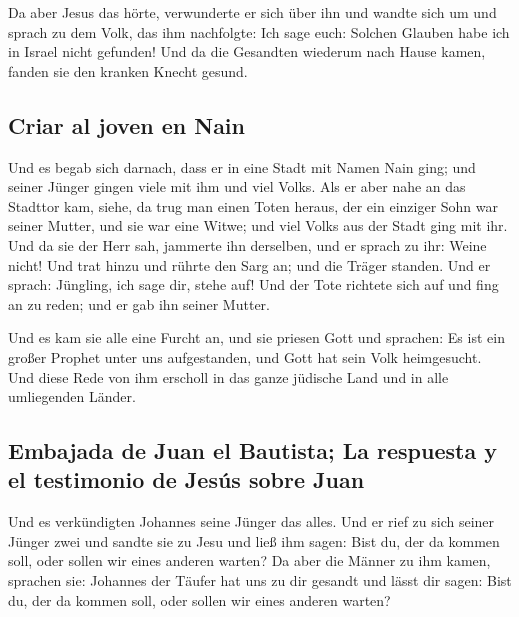  Da aber Jesus das hörte, verwunderte er sich über ihn und
wandte sich um und sprach zu dem Volk, das ihm nachfolgte: Ich sage
euch: Solchen Glauben habe ich in Israel nicht gefunden! 
Und da die Gesandten wiederum nach Hause kamen, fanden sie den kranken
Knecht gesund.

\hypertarget{criar-al-joven-en-nain}{%
\subsection{Criar al joven en Nain}\label{criar-al-joven-en-nain}}

 Und es begab sich darnach, dass er in eine Stadt mit
Namen Nain ging; und seiner Jünger gingen viele mit ihm und viel Volks.
 Als er aber nahe an das Stadttor kam, siehe, da trug man
einen Toten heraus, der ein einziger Sohn war seiner Mutter, und sie war
eine Witwe; und viel Volks aus der Stadt ging mit ihr. 
Und da sie der Herr sah, jammerte ihn derselben, und er sprach zu ihr:
Weine nicht!  Und trat hinzu und rührte den Sarg an; und
die Träger standen. Und er sprach: Jüngling, ich sage dir, stehe auf!
 Und der Tote richtete sich auf und fing an zu reden; und
er gab ihn seiner Mutter.

 Und es kam sie alle eine Furcht an, und sie priesen Gott
und sprachen: Es ist ein großer Prophet unter uns aufgestanden, und Gott
hat sein Volk heimgesucht.  Und diese Rede von ihm
erscholl in das ganze jüdische Land und in alle umliegenden Länder.

\hypertarget{embajada-de-juan-el-bautista-la-respuesta-y-el-testimonio-de-jesuxfas-sobre-juan}{%
\subsection{Embajada de Juan el Bautista; La respuesta y el testimonio
de Jesús sobre
Juan}\label{embajada-de-juan-el-bautista-la-respuesta-y-el-testimonio-de-jesuxfas-sobre-juan}}

 Und es verkündigten Johannes seine Jünger das alles. Und
er rief zu sich seiner Jünger zwei  und sandte sie zu
Jesu und ließ ihm sagen: Bist du, der da kommen soll, oder sollen wir
eines anderen warten?  Da aber die Männer zu ihm kamen,
sprachen sie: Johannes der Täufer hat uns zu dir gesandt und lässt dir
sagen: Bist du, der da kommen soll, oder sollen wir eines anderen
warten?

